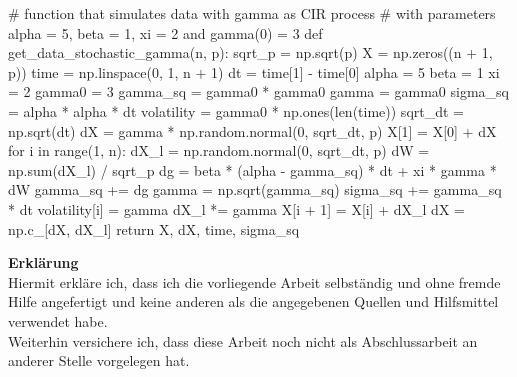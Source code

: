 \documentclass[a4paper,11pt]{book}
\theoremstyle{plain}
\theoremstyle{definition}
\begin{document}
\begin{python}
# function that simulates data with gamma as CIR process
# with parameters alpha = 5, beta = 1, xi = 2 and gamma(0) = 3   
def get_data_stochastic_gamma(n, p):
    sqrt_p = np.sqrt(p)
    X = np.zeros((n + 1, p))
    time = np.linspace(0, 1, n + 1)
    dt = time[1] - time[0]
    alpha = 5
    beta = 1
    xi = 2
    gamma0 = 3
    gamma_sq = gamma0 * gamma0
    gamma = gamma0
    sigma_sq = alpha * alpha * dt
    volatility = gamma0 * np.ones(len(time))
    sqrt_dt = np.sqrt(dt)
    dX = gamma * np.random.normal(0, sqrt_dt, p)
    X[1] = X[0] + dX
    for i in range(1, n):
        dX_l = np.random.normal(0, sqrt_dt, p)
        dW = np.sum(dX_l) / sqrt_p
        dg = beta * (alpha - gamma_sq) * dt + xi * gamma * dW
        gamma_sq += dg
        gamma = np.sqrt(gamma_sq)
        sigma_sq += gamma_sq * dt
        volatility[i] = gamma
        dX_l *= gamma
        X[i + 1] = X[i] + dX_l
        dX = np.c_[dX, dX_l]
    return X, dX, time, sigma_sq
    
\end{python}
    	
   	
   	\nocite{*}
   	
   	
   	\newpage
   	\thispagestyle{empty}
   	\large
   	\textbf{Erkl\"arung} \\
   	
   	Hiermit erkl\"are ich, dass ich die vorliegende Arbeit selbst\"andig und ohne fremde Hilfe angefertigt und keine anderen als die angegebenen Quellen und Hilfsmittel verwendet habe. \\
   	
   	Weiterhin versichere ich, dass diese Arbeit noch nicht als Abschlussarbeit an anderer Stelle vorgelegen hat. \\
\end{document}
